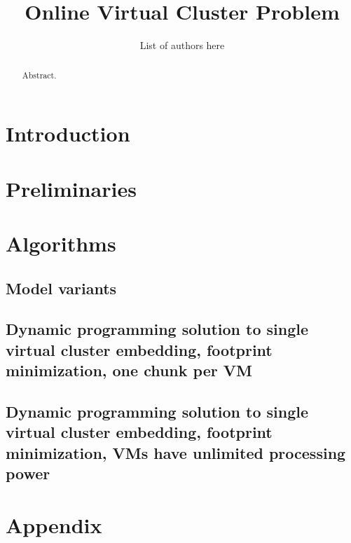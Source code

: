 \documentclass[11pt,a4paper]{scrartcl}
\title{Online Virtual Cluster Problem}
\author{List of authors here}
\begin{document}
\maketitle


\begin{abstract}
Abstract.
\end{abstract}

\section{Introduction}

\section{Preliminaries}


\section{Algorithms}

\subsection{Model variants}


\subsection{Dynamic programming solution to single virtual cluster
  embedding, footprint minimization, one chunk per VM}



\subsection{Dynamic programming solution to single virtual cluster
  embedding, footprint minimization, VMs have unlimited processing power}


\section{Appendix}



\end{document}
